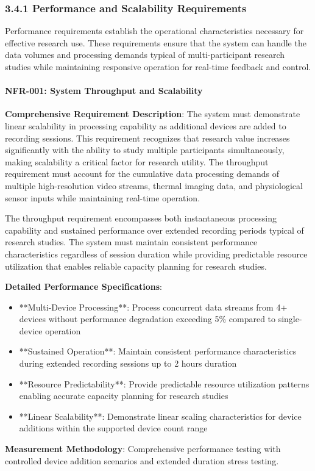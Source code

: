 \documentclass[12pt,a4paper]{article}
\begin{document}
\subsubsection{3.4.1 Performance and Scalability Requirements}

Performance requirements establish the operational characteristics necessary for effective research use. These
requirements ensure that the system can handle the data volumes and processing demands typical of multi-participant
research studies while maintaining responsive operation for real-time feedback and control.

\paragraph{NFR-001: System Throughput and Scalability}

\textbf{Comprehensive Requirement Description}: The system must demonstrate linear scalability in processing capability as
additional devices are added to recording sessions. This requirement recognizes that research value increases
significantly with the ability to study multiple participants simultaneously, making scalability a critical factor for
research utility. The throughput requirement must account for the cumulative data processing demands of multiple
high-resolution video streams, thermal imaging data, and physiological sensor inputs while maintaining real-time
operation.

The throughput requirement encompasses both instantaneous processing capability and sustained performance over extended
recording periods typical of research studies. The system must maintain consistent performance characteristics
regardless of session duration while providing predictable resource utilization that enables reliable capacity planning
for research studies.

\textbf{Detailed Performance Specifications}:

\begin{itemize}
\item **Multi-Device Processing**: Process concurrent data streams from 4+ devices without performance degradation exceeding
  5\% compared to single-device operation
\item **Sustained Operation**: Maintain consistent performance characteristics during extended recording sessions up to 2
  hours duration
\item **Resource Predictability**: Provide predictable resource utilization patterns enabling accurate capacity planning for
  research studies
\item **Linear Scalability**: Demonstrate linear scaling characteristics for device additions within the supported device
  count range

\end{itemize}
\textbf{Measurement Methodology}: Comprehensive performance testing with controlled device addition scenarios and extended
duration stress testing.
\end{document}
